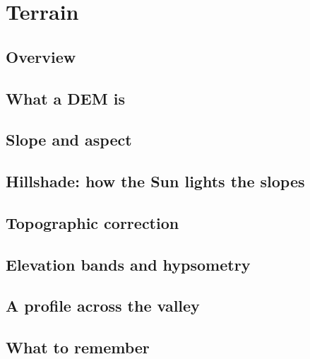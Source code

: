 \chapter{Terrain}\label{ch:terrain}

\section{Overview}


\section{What a DEM is}


\section{Slope and aspect}


\section{Hillshade: how the Sun lights the slopes}


\section{Topographic correction}


\section{Elevation bands and hypsometry}


\section{A profile across the valley}


\section{What to remember}

